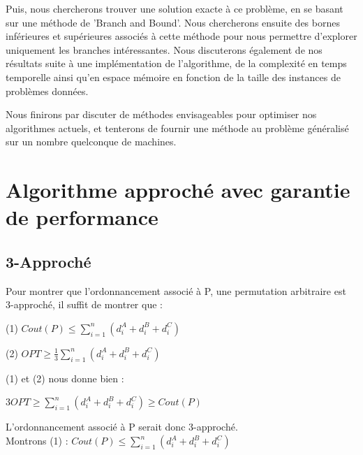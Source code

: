 \documentclass[12pt]{article}
\begin{document}
Puis, nous chercherons trouver une solution exacte à ce problème, en se basant sur une méthode  de 'Branch and Bound'. Nous chercherons ensuite des bornes inférieures et supérieures associés à cette méthode pour nous permettre d'explorer uniquement les branches intéressantes. Nous discuterons également de nos résultats suite à une implémentation de l'algorithme, de la complexité en temps temporelle ainsi qu'en espace mémoire en fonction de la taille des instances de problèmes données.

Nous finirons par discuter de méthodes envisageables pour optimiser nos algorithmes actuels, et tenterons de fournir une méthode au problème généralisé sur un nombre quelconque de machines. 

\clearpage
\newpage
\section{Algorithme approché avec garantie de performance}



\subsection{3-Approché}

Pour montrer que l'ordonnancement associé à P, une permutation arbitraire est 3-approché, il suffit de montrer que : \\
\begin{center}
(1) $Cout(P) \le \displaystyle\sum_{i=1}^n(d_i^A+d_i^B+d_i^C)$\\
\end{center}
\begin{center}
(2) $OPT \ge \frac{1}{3}\displaystyle\sum_{i=1}^n(d_i^A+d_i^B+d_i^C)$\\
\end{center}
(1) et (2) nous donne bien :\\
\begin{center}
$3OPT \ge \displaystyle\sum_{i=1}^n(d_i^A+d_i^B+d_i^C) \ge Cout(P)$\\
\end{center}
L'ordonnancement associé à P serait donc 3-approché.\\

Montrons (1) : $Cout(P) \le \displaystyle\sum_{i=1}^n(d_i^A+d_i^B+d_i^C)$\\
\end{document}
